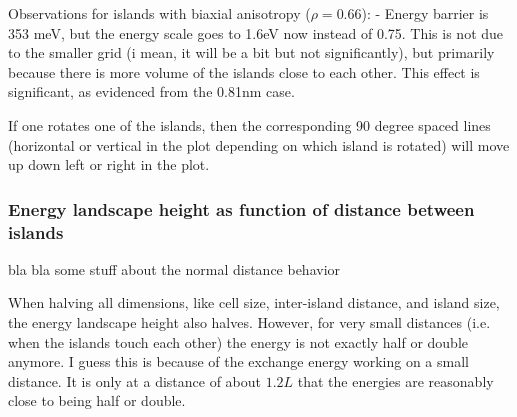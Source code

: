 \documentclass[11pt,a4paper,english]{article}
\begin{document}
Observations for islands with biaxial anisotropy ($\rho = 0.66$):
- Energy barrier is 353 meV, but the energy scale goes to 1.6eV now instead of 0.75. This is not due to the smaller grid (i mean, it will be a bit but not significantly), but primarily because there is more volume of the islands close to each other. This effect is significant, as evidenced from the 0.81nm case.

If one rotates one of the islands, then the corresponding 90 degree spaced lines (horizontal or vertical in the plot depending on which island is rotated) will move up down left or right in the plot.

\subsubsection{Energy landscape height as function of distance between islands}
bla bla some stuff about the normal distance behavior

When halving all dimensions, like cell size, inter-island distance, and island size, the energy landscape height also halves. However, for very small distances (i.e. when the islands touch each other) the energy is not exactly half or double anymore. I guess this is because of the exchange energy working on a small distance. It is only at a distance of about $1.2 L$ that the energies are reasonably close to being half or double.


\newpage


\end{document}
